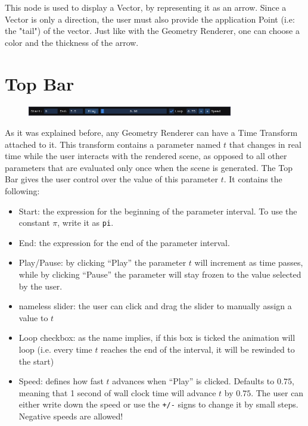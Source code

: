 This node is used to display a Vector, by representing it as an arrow.
Since a Vector is only a direction, the user must also provide the application Point (i.e: the "tail") of the vector.
Just like with the Geometry Renderer, one can choose a color and the thickness of the arrow.

\section{Top Bar}

\begin{figure}[H]
\centering
\includegraphics[width=0.8\textwidth]{figures/top_bar.png}
\end{figure}

As it was explained before, any Geometry Renderer can have a Time Transform attached to it.
This transform contains a parameter named $t$ that changes in real time while the
user interacts with the rendered scene, as opposed to all other parameters that are evaluated
only once when the scene is generated.
The Top Bar gives the user control over the value of this parameter $t$. It contains the following:

\begin{itemize}
    \item Start: the expression for the beginning of the parameter interval. To use
        the constant $\pi$, write it as \texttt{pi}.
    \item End: the expression for the end of the parameter interval.
    \item Play/Pause: by clicking ``Play'' the parameter $t$ will increment as time passes,
        while by clicking ``Pause'' the parameter will stay frozen to the value selected by the user.
    \item nameless slider: the user can click and drag the slider to manually assign a value to $t$
    \item Loop checkbox: as the name implies, if this box is ticked the animation will loop
        (i.e. every time $t$ reaches the end of the interval, it will be rewinded to the start)
    \item Speed: defines how fast $t$ advances when ``Play'' is clicked. Defaults to $0.75$,
        meaning that 1 second of wall clock time will advance $t$ by $0.75$. The user can either
        write down the speed or use the \texttt{+/-} signs to change it by small steps.
        Negative speeds are allowed!
\end{itemize}


